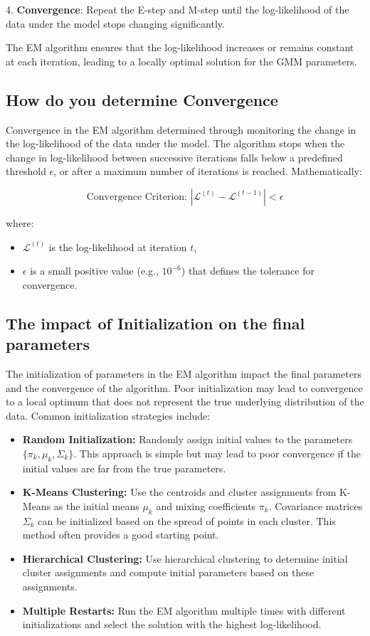 \documentclass{article}
\begin{document}
4. \textbf{Convergence}: Repeat the E-step and M-step until the log-likelihood of the data under the model stops changing significantly.

The EM algorithm ensures that the log-likelihood increases or remains constant at each iteration, leading to a locally optimal solution for the GMM parameters.

\subsection*{How do you determine Convergence}
Convergence in the EM algorithm  determined through monitoring the change in the log-likelihood of the data under the model. The algorithm stops when the change in log-likelihood between successive iterations falls below a predefined threshold \(\epsilon\), or after a maximum number of iterations is reached. Mathematically:

\[
\text{Convergence Criterion: } |\mathcal{L}^{(t)} - \mathcal{L}^{(t-1)}| < \epsilon
\]

where:
\begin{itemize}
    \item \(\mathcal{L}^{(t)}\) is the log-likelihood at iteration \(t\),
    \item \(\epsilon\) is a small positive value (e.g., \(10^{-6}\)) that defines the tolerance for convergence.
\end{itemize}

\subsection*{The impact of Initialization on the final parameters}
The initialization of parameters in the EM algorithm impact the final parameters and the convergence of the algorithm. 
Poor initialization may lead to convergence to a local optimum that does not represent the true underlying distribution of the data.
 Common initialization strategies include:

\begin{itemize}
    \item \textbf{Random Initialization:} Randomly assign initial values to the parameters \(\{\pi_k, \mu_k, \Sigma_k\}\). This approach is simple but may lead to poor convergence if the initial values are far from the true parameters.
    \item \textbf{K-Means Clustering:} Use the centroids and cluster assignments from K-Means as the initial means \(\mu_k\) and mixing coefficients \(\pi_k\). Covariance matrices \(\Sigma_k\) can be initialized based on the spread of points in each cluster. This method often provides a good starting point.
    \item \textbf{Hierarchical Clustering:} Use hierarchical clustering to determine initial cluster assignments and compute initial parameters based on these assignments.
    \item \textbf{Multiple Restarts:} Run the EM algorithm multiple times with different initializations and select the solution with the highest log-likelihood.
\end{itemize}
\end{document}
